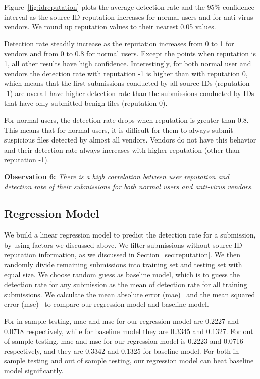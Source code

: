 Figure~\ref{fig:idreputation} plots the average detection rate and the 95\% confidence interval 
as the source ID reputation increases for normal users and for anti-virus vendors.
We round up reputation values to their nearest 0.05 values. 

Detection rate steadily increase as the reputation increases from 0 to 1 for vendors and from 0 to 0.8 for normal users.
Except the points when reputation is 1, all other results have high confidence.
Interestingly, for both normal user and vendors the detection rate with reputation -1 is higher than with reputation 0,
which means that the first submissions conducted by all source IDs (reputation -1) 
are overall have higher detection rate than 
the submissions conducted by IDs that have only submitted benign files (reputation 0).

For normal users, the detection rate drops when reputation is greater than 0.8.
This means that for normal users, it is difficult for them to always submit suspicious files detected by almost all vendors.
Vendors do not have this behavior and their detection rate always increases with higher reputation (other than reputation -1).


{\bf Observation 6:} 
{\em There is a high correlation between user reputation and detection rate of their submissions for both normal users and anti-virus vendors.}


\subsection{Regression Model}

We build a linear regression model to predict the detection rate for a submission, 
by using factors we discussed above.  
We filter submissions without source ID reputation information, as we discussed in Section~\ref{sec:reputation}. 
We then randomly divide remaining submissions into training set and testing set with equal size. 
We choose random guess as baseline model, 
which is to guess the detection rate for any submission 
as the mean of detection rate for all training submissions. 
We calculate the mean absolute error (mae)~\cite{mae} 
and the mean squared error (mse)~\cite{mse} to compare our regression model and baseline model. 

For in sample testing, mae and mse for our regression model are 0.2227 and 0.0718 respectively, 
while for baseline model they are 0.3345 and 0.1327. 
For out of sample testing, mae and mse for our regression model is 0.2223 and 0.0716 respectively, 
and they are 0.3342 and 0.1325 for baseline model. 
For both in sample testing and out of sample testing, our regression model can beat baseline model significantly. 


